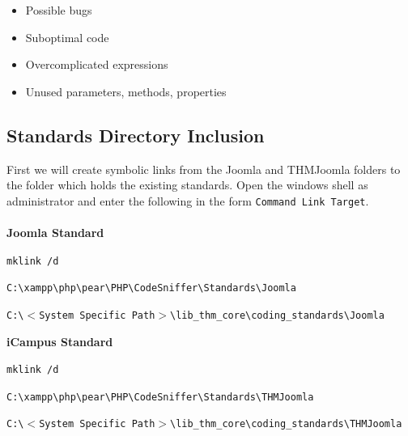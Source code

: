 \documentclass[]{report}
\begin{document}
\begin{itemize}
	\item Possible bugs
	\item Suboptimal code
	\item Overcomplicated expressions
	\item Unused parameters, methods, properties
\end{itemize}

\subsection{Standards Directory Inclusion}

First we will create symbolic links from the Joomla and THMJoomla folders to the folder which holds the existing standards. Open the windows shell as administrator and enter the following in the form \texttt{Command Link Target}.\\
\\
\textbf{Joomla Standard}
\begin{description}
	\itemsep-10pt
	\item[Command] \texttt{mklink /d}\\
	\item[Link] \texttt{C:\textbackslash xampp\textbackslash php\textbackslash pear\textbackslash PHP\textbackslash CodeSniffer\textbackslash Standards\textbackslash Joomla}\\
	\item[Target] \texttt{C:\textbackslash $<$System Specific Path$>$\textbackslash lib\_thm\_core\textbackslash coding\_standards\textbackslash Joomla}\\
\end{description}

\noindent
\textbf{iCampus Standard}
\begin{description}
	\itemsep-10pt
	\item[Command] \texttt{mklink /d}\\
	\item[Link] \texttt{C:\textbackslash xampp\textbackslash php\textbackslash pear\textbackslash PHP\textbackslash CodeSniffer\textbackslash Standards\textbackslash THMJoomla}\\
	\item[Target] \texttt{C:\textbackslash $<$System Specific Path$>$\textbackslash lib\_thm\_core\textbackslash coding\_standards\textbackslash THMJoomla}\\
\end{description}
\end{document}
